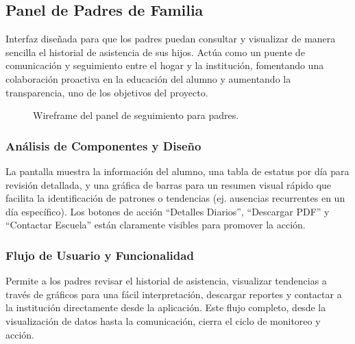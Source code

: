 \subsection{ Panel de Padres de Familia}
\begin{samepage}\small
Interfaz diseñada para que los padres puedan consultar y visualizar de manera sencilla el historial de asistencia de sus hijos. Actúa como un puente de comunicación y seguimiento entre el hogar y la institución, fomentando una colaboración proactiva en la educación del alumno y aumentando la transparencia, uno de los objetivos del proyecto.
\begin{figure}[H]\centering
    \caption{Wireframe del panel de seguimiento para padres.}\label{fig:wf-parents-panel}
\end{figure}
    \subsubsection*{Análisis de Componentes y Diseño}
    La pantalla muestra la información del alumno, una tabla de estatus por día para revisión detallada, y una gráfica de barras para un resumen visual rápido que facilita la identificación de patrones o tendencias (ej. ausencias recurrentes en un día específico). Los botones de acción ``Detalles Diarios'', ``Descargar PDF'' y ``Contactar Escuela'' están claramente visibles para promover la acción.
    
    \subsubsection*{Flujo de Usuario y Funcionalidad}
    Permite a los padres revisar el historial de asistencia, visualizar tendencias a través de gráficos para una fácil interpretación, descargar reportes y contactar a la institución directamente desde la aplicación. Este flujo completo, desde la visualización de datos hasta la comunicación, cierra el ciclo de monitoreo y acción.
\normalsize\end{samepage}

